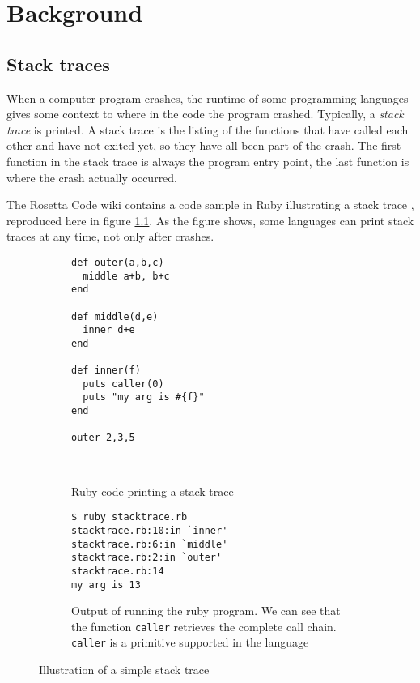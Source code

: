 \chapter{Background}


\section{Stack traces}

When a computer program crashes, the runtime of some programming languages
gives some context to where in the code the program crashed.
Typically, a \emph{stack trace} is printed. A stack trace is the listing
of the functions that have called each other and have not exited yet, so
they have all been part of the crash. The first function in the stack
trace is always the program entry point, the last function is where the
crash actually occurred.

The Rosetta Code wiki contains a code sample in Ruby illustrating a stack
trace \cite{rosetta_stone_st}, reproduced here in figure
\ref{fig:ruby_stack_trace}. As the figure shows, some languages can print stack
traces at any time, not only after crashes.

\begin{figure}
\begin{mdframed}
  \begin{subfigure}[t]{0.5\textwidth}
      \begin{verbatim}
def outer(a,b,c)
  middle a+b, b+c
end

def middle(d,e)
  inner d+e
end

def inner(f)
  puts caller(0)
  puts "my arg is #{f}"
end

outer 2,3,5
       \end{verbatim}
    \caption{Ruby code printing a stack trace}
    ~ %
  \end{subfigure}
        \begin{subfigure}[t]{0.5\textwidth}
          \begin{verbatim}
$ ruby stacktrace.rb
stacktrace.rb:10:in `inner'
stacktrace.rb:6:in `middle'
stacktrace.rb:2:in `outer'
stacktrace.rb:14
my arg is 13
          \end{verbatim}
          \caption{Output of running the ruby program. We can see that the
            function \texttt{caller} retrieves the complete call chain. \texttt{caller} is
            a primitive supported in the language}
        \end{subfigure}
        \caption{Illustration of a simple stack trace
        }\label{fig:ruby_stack_trace}
\end{mdframed}
\end{figure}

